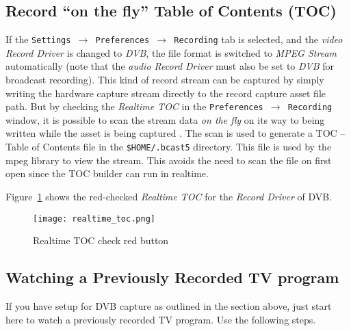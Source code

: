 \subsection{Record “on the fly” Table of Contents (TOC)}%
\label{sub:record_on_the_fly_toc}

If the \texttt{Settings $\rightarrow$ Preferences $\rightarrow$ Recording} tab is selected, and the \textit{video Record Driver} is changed to \textit{DVB}, the file format is switched to \textit{MPEG Stream} automatically (note that the \textit{audio Record Driver} must also be set to \textit{DVB} for broadcast recording).  This kind of record stream can be captured by simply writing the hardware capture stream directly to the record capture asset file path.  But by checking the \textit{Realtime TOC} in the \texttt{Preferences $\rightarrow$ Recording} window, it is possible to scan the stream data \textit{on the fly} on its way to being written while the asset is being captured .  The scan is used to generate a TOC – Table of Contents file in the \texttt{\$HOME/.bcast5} directory.  This file is used by the mpeg library to view the stream.  This avoids the need to scan the file on first open since the TOC builder can run in realtime.

Figure~\ref{fig:realtime_toc} shows the red-checked \textit{Realtime TOC} for the \textit{Record Driver} of DVB.

\begin{figure}[htpb]
    \centering
    \texttt{[image: realtime\_toc.png]}
    \caption{Realtime TOC check red button}
    \label{fig:realtime_toc}
\end{figure}

\subsection{Watching a Previously Recorded TV program}%
\label{sub:watching_recorded_tv_program}

If you have setup for DVB capture as outlined in the section above, just start here to watch a previously recorded TV program.  Use the following steps.


